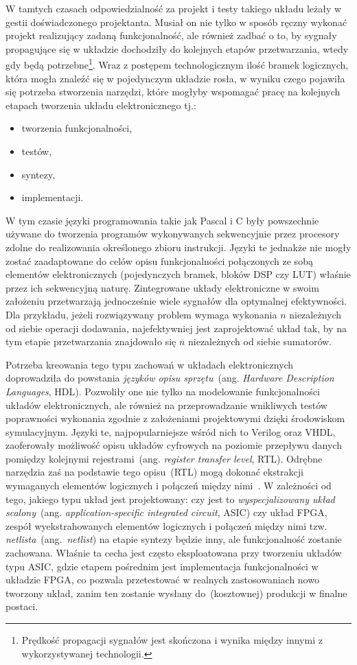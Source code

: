 W tamtych czasach odpowiedzialność za projekt i testy takiego układu leżały w gestii doświadczonego projektanta. Musiał on nie tylko w sposób ręczny wykonać projekt realizujący zadaną funkcjonalność, ale również zadbać o to, by sygnały propagujące się w układzie dochodziły do kolejnych etapów przetwarzania, wtedy gdy będą potrzebne\footnote{Prędkość propagacji sygnałów jest skończona i wynika między innymi z wykorzystywanej technologii.}. Wraz z postępem technologicznym ilość bramek logicznych, która mogła znaleźć się w pojedynczym układzie rosła, w wyniku czego pojawiła się potrzeba stworzenia narzędzi, które mogłyby wspomagać pracę na kolejnych etapach tworzenia układu elektronicznego tj.:
\begin{itemize}
\item tworzenia funkcjonalności,
\item testów, 
\item syntezy,
\item implementacji. 
\end{itemize}

W tym czasie języki programowania takie jak Pascal i C były powszechnie używane do tworzenia programów wykonywanych sekwencyjnie przez procesory zdolne do realizowania określonego zbioru instrukcji. Języki te jednakże nie mogły zostać zaadaptowane do celów opisu funkcjonalności połączonych ze sobą elementów elektronicznych (pojedynczych bramek, bloków DSP czy LUT) właśnie przez ich sekwencyjną naturę. Zintegrowane układy elektroniczne w swoim założeniu przetwarzają jednocześnie wiele sygnałów dla optymalnej efektywności. Dla przykładu, jeżeli rozwiązywany problem wymaga wykonania $n$ niezależnych od siebie operacji dodawania, najefektywniej jest zaprojektować układ tak, by na tym etapie przetwarzania znajdowało się $n$ niezależnych od siebie sumatorów. 

Potrzeba kreowania tego typu zachowań w układach elektronicznych doprowadziła do powstania \textit{języków opisu sprzętu}~(ang. \textit{Hardware Description Languages}, HDL). Pozwoliły one nie tylko na modelowanie funkcjonalności układów elektronicznych, ale również na przeprowadzanie wnikliwych testów poprawności wykonania zgodnie z założeniami projektowymi dzięki środowiskom symulacyjnym. Języki te, najpopularniejsze wśród nich to Verilog oraz VHDL, zaoferowały możliwość opisu układów cyfrowych na poziomie przepływu danych pomiędzy kolejnymi rejestrami~(ang. \textit{register transfer level}, RTL). Odrębne narzędzia zaś na podstawie tego opisu~(RTL) mogą dokonać ekstrakcji wymaganych elementów logicznych i połączeń między nimi~\cite{VERILOG_BIBLE}. W zależności od tego, jakiego typu układ jest projektowany: czy jest to \textit{wyspecjalizowany układ scalony}~(ang. \textit{application-specific integrated circuit}, ASIC) czy układ FPGA, zespół wyekstrahowanych elementów logicznych i połączeń między nimi tzw. \textit{netlista}~(ang.~\textit{netlist}) na etapie syntezy będzie inny, ale funkcjonalność zostanie zachowana. Właśnie ta cecha jest często eksploatowana przy tworzeniu układów typu ASIC, gdzie etapem pośrednim jest implementacja funkcjonalności w układzie FPGA, co pozwala przetestować w realnych zastosowaniach nowo tworzony układ, zanim ten zostanie wysłany do~(kosztownej) produkcji w finalne postaci. 

